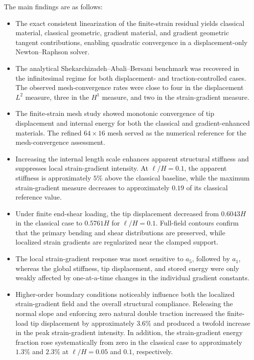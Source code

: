 \documentclass[preprint,12pt]{elsarticle}
\begin{document}
The main findings are as follows:
\begin{itemize}
 \item The exact consistent linearization of the finite-strain residual yields
 classical material, classical geometric, gradient material, and gradient
 geometric tangent contributions, enabling quadratic convergence in a
 displacement-only Newton--Raphson solver.

 \item The analytical Shekarchizadeh--Abali--Bersani benchmark was
 recovered in the infinitesimal regime for both displacement- and
 traction-controlled cases. The observed mesh-convergence rates were
 close to four in the displacement $L^2$ measure, three in the $H^1$
 measure, and two in the strain-gradient measure.

 \item The finite-strain mesh study showed monotonic convergence of tip
 displacement and internal energy for both the classical and
gradient-enhanced materials. The refined $64\times16$ mesh served as the numerical reference for the
mesh-convergence assessment.

 \item Increasing the internal length scale enhances apparent structural
 stiffness and suppresses local strain-gradient intensity. At $\ell/H=0.1$,
 the apparent stiffness is approximately $5\%$ above the classical baseline,
 while the maximum strain-gradient measure decreases to approximately $0.19$
 of its classical reference value.

 \item Under finite end-shear loading, the tip displacement decreased from
 $0.6043H$ in the classical case to $0.5761H$ for $\ell/H=0.1$.
 Full-field contours confirm that the primary bending and shear
 distributions are preserved, while localized strain gradients are
 regularized near the clamped support.

 \item The local strain-gradient response was most sensitive to $a_5$,
 followed by $a_1$, whereas the global stiffness, tip displacement, and
 stored energy were only weakly affected by one-at-a-time changes in the
 individual gradient constants.

 \item Higher-order boundary conditions noticeably influence both the
 localized strain-gradient field and the overall structural compliance.
 Releasing the normal slope and enforcing zero natural double traction
 increased the finite-load tip displacement by approximately $3.6\%$ and
 produced a twofold increase in the peak strain-gradient intensity. In
 addition, the strain-gradient energy fraction rose systematically from zero
 in the classical case to approximately $1.3\%$ and $2.3\%$ at $\ell/H=0.05$
 and $0.1$, respectively.
\end{itemize}
\end{document}
